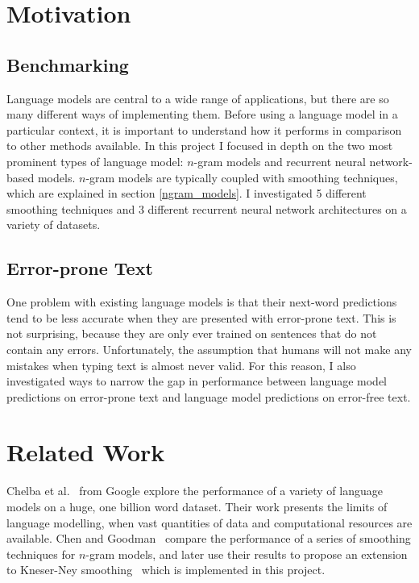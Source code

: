 \documentclass[a4paper, 12pt]{report}
\begin{document}
\section{Motivation}


\subsection*{Benchmarking}

Language models are central to a wide range of applications, but there are so many different ways of implementing them. Before using a language model in a particular context, it is important to understand how it performs in comparison to other methods available. In this project I focused in depth on the two most prominent types of language model: $n$-gram models and recurrent neural network-based models. $n$-gram models are typically coupled with smoothing techniques, which are explained in section \ref{ngram_models}. I investigated 5 different smoothing techniques and 3 different recurrent neural network architectures on a variety of datasets.

\subsection*{Error-prone Text}

One problem with existing language models is that their next-word predictions tend to be less accurate when they are presented with error-prone text. This is not surprising, because they are only ever trained on sentences that do not contain any errors. Unfortunately, the assumption that humans will not make any mistakes when typing text is almost never valid.  For this reason, I also investigated ways to narrow the gap in performance between language model predictions on error-prone text and language model predictions on error-free text. 

\section{Related Work}

Chelba et al.~\cite{1bw:chelba2013} from Google explore the performance of a variety of language models on a huge, one billion word dataset. Their work presents the limits of language modelling, when vast quantities of data and computational resources are available. Chen and Goodman~\cite{smoothing:chen1996} compare the performance of a series of smoothing techniques for $n$-gram models, and later use their results to propose an extension to Kneser-Ney smoothing~\cite{modified_kneser_ney:chen1999} which is implemented in this project. \\
\end{document}
